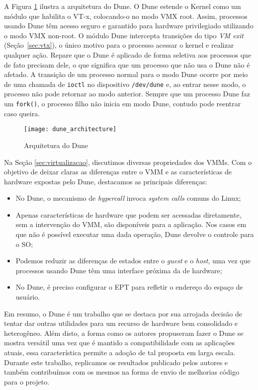 A Figura \ref{fig:dune_architecture} ilustra a arquitetura do Dune. O Dune
estende o Kernel como um módulo que habilita o VT-x, colocando-o no
modo VMX root. Assim, processos usando Dune têm acesso seguro e garantido para
hardware privilegiado utilizando o modo VMX non-root. O módulo Dune intercepta
transições do tipo \emph{VM exit} (Seção~\ref{sec:vtx}), o único motivo para o
processo acessar o kernel e realizar qualquer ação. Repare que o Dune é
aplicado de forma seletiva aos processos que de fato precisam dele, o que
significa que um processo que não usa o Dune não é afetado. A transição de um
processo normal para o modo Dune ocorre por meio de uma chamada de
\texttt{ioctl} no dispositivo \texttt{/dev/dune} e, ao entrar nesse modo, o
processo não pode retornar ao modo anterior. Sempre que um processo Dune faz um
\texttt{fork()}, o processo filho não inicia em modo Dune, contudo pode
reentrar caso queira.

\begin{figure}[!h]
  \centering
  \texttt{[image: dune\_architecture]} 
	\caption[Arquitetura do Dune]{Arquitetura do Dune~\citep{belay}}
  \label{fig:dune_architecture}
\end{figure}

Na Seção \ref{sec:virtualizacao}, discutimos diversas propriedades dos VMMs.
Com o objetivo de deixar claras as diferenças entre o VMM e as características
de hardware expostas pelo Dune, destacamos as principais diferenças:

\begin{itemize}
  \item No Dune, o mecanismo de \textit{hypercall} invoca
        \textit{system calls} comuns do Linux;
  \item Apenas características de hardware que podem ser acessadas diretamente,
        sem a intervenção do VMM, são disponíveis para a aplicação. Nos casos em
        que não é possível executar uma dada operação, Dune devolve o controle
        para o SO;
  \item Podemos reduzir as diferenças de estados entre o \textit{guest} e o \textit{host}, uma
        vez que processos usando Dune têm uma interface próxima da de hardware;
  \item No Dune, é preciso configurar o EPT para refletir o endereço do espaço
        de usuário.
\end{itemize}

Em resumo, o Dune é um trabalho que se destaca por sua arrojada decisão de
tentar dar outras utilidades para um recurso de hardware bem consolidado e
heterogêneo. Além disto, a forma como os autores propuseram fazer o Dune
se mostra versátil uma vez que é mantido a compatibilidade com as aplicações
atuais, essa característica permite a adoção de tal proposta em larga escala.
Durante este trabalho, replicamos os resultados publicado pelos autores e
também contribuímos com os mesmos na forma de envio de melhorias código para o
projeto.

